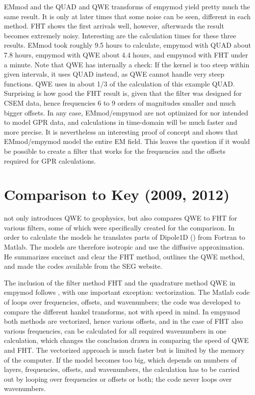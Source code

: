 \documentclass[manuscript,revised]{geophysics}
\begin{document}
EMmod and the QUAD and QWE transforms of empymod yield pretty much the same
result. It is only at later times that some noise can be seen, different in
each method. FHT shows the first arrivals well, however, afterwards the result
becomes extremely noisy.
%
%
Interesting are the calculation times for these three results. EMmod took
roughly 9.5 hours to calculate, empymod with QUAD about 7.8 hours, empymod with
QWE about 4.4 hours, and empymod with FHT under a minute. Note that QWE has
internally a check: If the kernel is too steep within given intervals, it uses
QUAD instead, as QWE cannot handle very steep functions. QWE uses in about 1/3
of the calculation of this example QUAD. Surprising is how good the FHT result
is, given that the filter was designed for CSEM data, hence frequencies 6 to 9
orders of magnitudes smaller and much bigger offsets. In any case,
EMmod/empymod are not optimized for nor intended to model GPR data, and
calculations in time-domain will be much faster and more precise. It is
nevertheless an interesting proof of concept and shows that EMmod/empymod model
the entire EM field. This leaves the question if it would be possible to
create a filter that works for the frequencies and the offsets required for GPR
calculations.


\section{Comparison to Key (2009, 2012)}

\cite{GEO.12.Key} not only introduces QWE to geophysics, but also compares QWE
to FHT for various filters, some of which were specifically created for the
comparison. In order to calculate the models he translates parts of Dipole1D
(\cite{GEO.09.Key}) from Fortran to Matlab. The models are therefore isotropic
and use the diffusive approximation. He summarizes succinct and clear the FHT
method, outlines the QWE method, and made the codes available from the SEG
website.

The inclusion of the filter method FHT and the quadrature method QWE in empymod
follows \cite{GEO.12.Key}, with one important exception: vectorization. The
Matlab code of \cite{GEO.12.Key} loops over frequencies, offsets, and
wavenumbers; the code was developed to compare the different hankel transforms,
not with speed in mind. In empymod both methods are vectorized, hence various
offsets, and in the case of FHT also various frequencies, can be calculated for
all required wavenumbers in one calculation, which changes the conclusion drawn
in \cite{GEO.12.Key} comparing the speed of QWE and FHT. The vectorized
approach is much faster but is limited by the memory of the computer. If the
model becomes too big, which depends on numbers of layers, frequencies,
offsets, and wavenumbers, the calculation has to be carried out by looping over
frequencies or offsets or both; the code never loops over wavenumbers.
\end{document}
